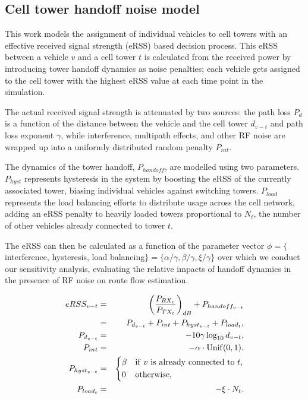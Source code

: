 \subsection{Cell tower handoff noise model}

This work models the assignment of individual vehicles to cell towers with an effective received signal strength (eRSS) based decision process.  This eRSS between a vehicle $v$ and a cell tower $t$ is calculated from the received power by introducing tower handoff dynamics as noise penalties;
each vehicle gets assigned to the cell tower with the highest eRSS value at each time point in the simulation.

The actual received signal strength is attenuated by two sources: the path loss $P_d$ is a function of the distance between the vehicle and the cell tower $d_{v-t}$ and path loss exponent $\gamma$, while 
interference, multipath effects, and other RF noise are wrapped up into a uniformly distributed random penalty $P_{int}$.

The dynamics of the tower handoff, $P_{handoff}$, are modelled using two parameters.  $P_{hyst}$ represents hysteresis in the system by boosting the eRSS of the currently associated tower, biasing individual vehicles against switching towers.  $P_{load}$ represents the load balancing efforts to distribute usage across the cell network, adding an eRSS penalty to heavily loaded towers proportional to $N_t$, the number of other vehicles already connected to tower $t$.  

The eRSS can then be calculated as a function of the parameter vector $\phi = \{$interference, hysteresis, load balancing$\} = \{\alpha/\gamma, \beta/\gamma, \xi/\gamma\}$ over which we conduct our sensitivity analysis, evaluating the relative impacts of handoff dynamics in the presence of RF noise on route flow estimation.

\begin{eqnarray}
  eRSS_{v-t} & = & \left( \frac{P_{RX_v}}{P_{TX_t}} \right)_{dB} 
                   + P_{handoff_{v-t}} \\
  & = & P_{d_{v-t}} +P_{int} + P_{hyst_{v-t}} + P_{load_t}, \\
  P_{d_{v-t}} & = & -10 \gamma \log_{10} d_{v-t}, \\
  P_{int} & = & -\alpha \cdot \mathrm{Unif}(0,1). \\
  P_{hyst_{v-t}} & = & \begin{dcases}
    \beta & \mathrm{if~} v \mathrm{~is~already~connected~to~} t, \\
    0 & \mathrm{otherwise,}
  \end{dcases} \\
  P_{load_t} & = & -\xi \cdot N_{t}.
\end{eqnarray}


